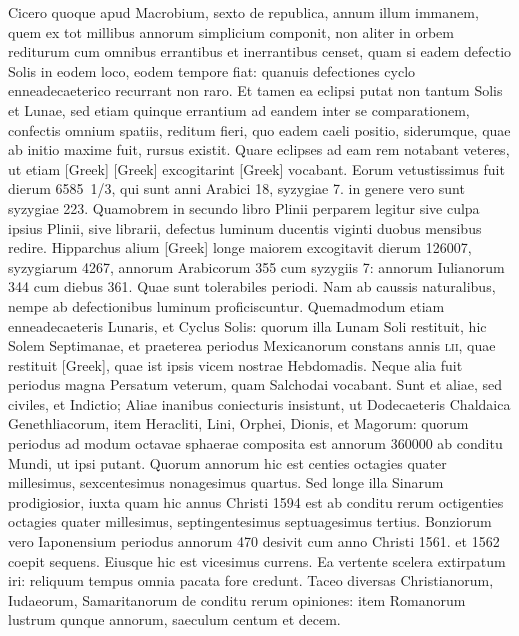 Cicero quoque apud Macrobium,
sexto de republica, annum illum immanem, quem ex tot millibus
annorum simplicium componit, non aliter in orbem rediturum
cum omnibus errantibus et inerrantibus censet, quam si eadem defectio
Solis in eodem loco, eodem tempore fiat: quanuis defectiones
cyclo enneadecaeterico recurrant non raro.
Et tamen ea eclipsi putat
non tantum Solis et Lunae, sed etiam quinque errantium ad eandem
inter se comparationem, confectis omnium spatiis, reditum fieri, quo
eadem caeli positio, siderumque, quae ab initio maxime fuit, rursus existit.
Quare eclipses ad eam rem notabant veteres, ut etiam
 \textgreek{[Greek]}
\textgreek{[Greek]} excogitarint \textgreek{[Greek]} vocabant.
Eorum vetustissimus fuit
dierum 6585~1/3, qui sunt anni Arabici 18, syzygiae 7. in genere vero
sunt syzygiae 223.
Quamobrem in secundo libro Plinii perparem legitur
sive culpa ipsius Plinii, sive librarii, defectus luminum ducentis
viginti duobus mensibus redire.
Hipparchus alium \textgreek{[Greek]} longe
maiorem excogitavit dierum 126007, syzygiarum 4267, annorum
Arabicorum 355 cum syzygiis 7: annorum Iulianorum 344 cum
diebus 361.
Quae sunt tolerabiles periodi.
Nam ab caussis naturalibus,
nempe ab defectionibus luminum proficiscuntur.
Quemadmodum
etiam enneadecaeteris Lunaris, et Cyclus Solis: quorum illa Lunam
Soli restituit, hic Solem Septimanae, et praeterea periodus Mexicanorum
constans annis \textsc{lii}, quae restituit
 \textgreek{[Greek]}, quae ist ipsis
vicem nostrae Hebdomadis.
Neque alia fuit periodus magna Persatum
veterum, quam Salchodai vocabant.
Sunt et aliae, sed civiles, et Indictio;
Aliae inanibus coniecturis insistunt, ut Dodecaeteris Chaldaica
Genethliacorum, item Heracliti, Lini, Orphei, Dionis, et Magorum:
quorum periodus ad modum octavae sphaerae composita est annorum
360000 ab conditu Mundi, ut ipsi putant.
Quorum annorum hic est
centies octagies quater millesimus, sexcentesimus nonagesimus quartus.
Sed longe illa Sinarum prodigiosior, iuxta quam hic annus Christi
1594 est ab conditu rerum octigenties octagies quater millesimus,
septingentesimus septuagesimus tertius.
Bonziorum vero Iaponensium
periodus annorum 470 desivit cum anno Christi 1561. et 1562
coepit sequens.
Eiusque hic est vicesimus currens.
Ea vertente scelera
extirpatum iri: reliquum tempus omnia pacata fore credunt.
Taceo
diversas Christianorum, Iudaeorum, Samaritanorum de conditu rerum
opiniones: item Romanorum lustrum qunque annorum, saeculum
centum et decem.

